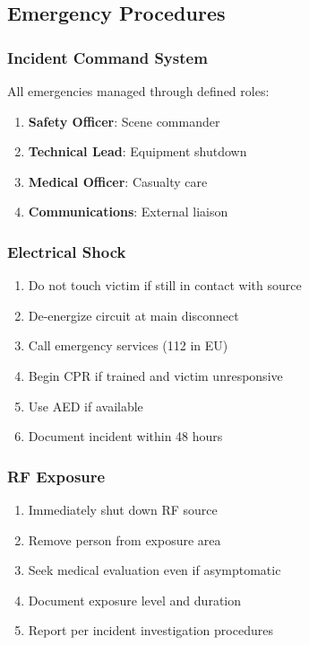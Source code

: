\subsection{Emergency Procedures}

\subsubsection{Incident Command System}
All emergencies managed through defined roles:
\begin{enumerate}[noitemsep]
    \item \textbf{Safety Officer}: Scene commander
    \item \textbf{Technical Lead}: Equipment shutdown
    \item \textbf{Medical Officer}: Casualty care
    \item \textbf{Communications}: External liaison
\end{enumerate}

\subsubsection{Electrical Shock}
\begin{enumerate}[noitemsep]
    \item Do not touch victim if still in contact with source
    \item De-energize circuit at main disconnect
    \item Call emergency services (112 in EU)
    \item Begin CPR if trained and victim unresponsive
    \item Use AED if available
    \item Document incident within 48 hours
\end{enumerate}

\subsubsection{RF Exposure}
\begin{enumerate}[noitemsep]
    \item Immediately shut down RF source
    \item Remove person from exposure area
    \item Seek medical evaluation even if asymptomatic
    \item Document exposure level and duration
    \item Report per incident investigation procedures
\end{enumerate}

